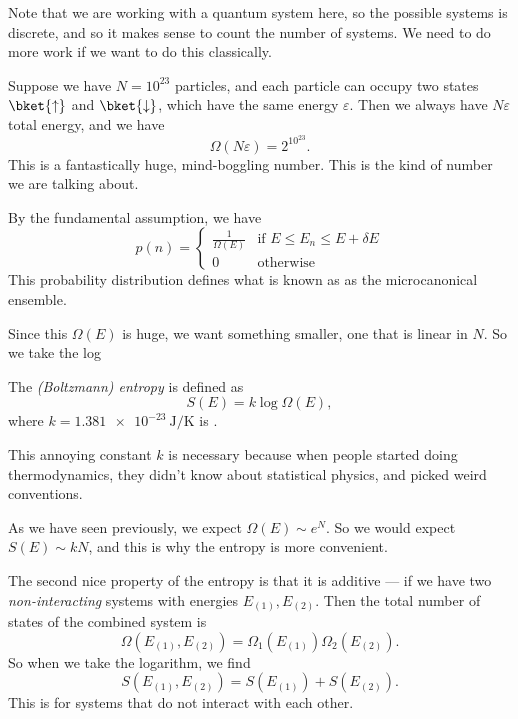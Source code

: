 \documentclass[a4paper]{article}
\begin{document}
Note that we are working with a quantum system here, so the possible systems is discrete, and so it makes sense to count the number of systems. We need to do more work if we want to do this classically.

\begin{eg}
  Suppose we have $N = 10^{23}$ particles, and each particle can occupy two states $\bket{\uparrow}$ and $\bket{\downarrow}$, which have the same energy $\varepsilon$. Then we always have $N\varepsilon$ total energy, and we have
  \[
    \Omega(N\varepsilon) = 2^{10^{23}}.
  \]
  This is a fantastically huge, mind-boggling number. This is the kind of number we are talking about.
\end{eg}

By the fundamental assumption, we have
\[
  p(n) =
  \begin{cases}
    \frac{1}{\Omega(E)} & \text{if } E \leq E_n \leq E + \delta E\\
    0 & \text{otherwise}
  \end{cases}
\]
This probability distribution defines what is known as as the microcanonical ensemble. %

Since this $\Omega(E)$ is huge, we want something smaller, one that is linear in $N$. So we take the log

\begin{defi}
  The \emph{(Boltzmann) entropy} is defined as
  \[
    S(E) = k \log \Omega(E),
  \]
  where $k = \SI{1.381e-23}{\joule\per\kelvin}$ is .
\end{defi}
This annoying constant $k$ is necessary because when people started doing thermodynamics, they didn't know about statistical physics, and picked weird conventions.

As we have seen previously, we expect $\Omega(E) \sim e^N$. So we would expect $S(E) \sim kN$, and this is why the entropy is more convenient.

The second nice property of the entropy is that it is additive --- if we have two \emph{non-interacting} systems with energies $E_{(1)}, E_{(2)}$. Then the total number of states of the combined system is
\[
  \Omega(E_{(1)}, E_{(2)}) = \Omega_{1}(E_{(1)})\Omega_{2} (E_{(2)}).
\]
So when we take the logarithm, we find
\[
  S(E_{(1)}, E_{(2)}) = S(E_{(1)}) + S(E_{(2)}).
\]
This is for systems that do not interact with each other.
\end{document}
